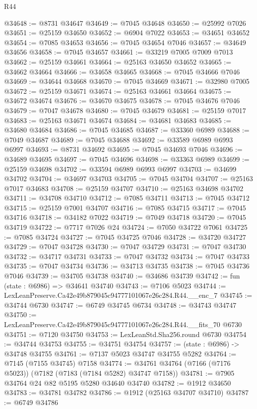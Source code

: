 \begin{lexlean}{R44}
\begin{coremodule}
{@34648 := @8731 @34647
@34649 := @7045 @34648
@34650 := @25992 @7026
@34651 := @25159 @34650
@34652 := @6904 @7022
@34653 := @34651 @34652
@34654 := @7085 @34653
@34656 := @7045 @34654 @7046
@34657 := @34649 @34656
@34658 := @7045 @34657
@34661 := @33219 @7005 @7009 @7013
@34662 := @25159 @34661
@34664 := @25163 @34650 @34652
@34665 := @34662 @34664
@34666 := @34658 @34665
@34668 := @7045 @34666 @7046
@34669 := @34644 @34668
@34670 := @7045 @34669
@34671 := @32980 @7005
@34672 := @25159 @34671
@34674 := @25163 @34661 @34664
@34675 := @34672 @34674
@34676 := @34670 @34675
@34678 := @7045 @34676 @7046
@34679 := @7047 @34678
@34680 := @7045 @34679
@34681 := @25159 @7017
@34683 := @25163 @34671 @34674
@34684 := @34681 @34683
@34685 := @34680 @34684
@34686 := @7045 @34685
@34687 := @33360 @6989
@34688 := @7049 @34687
@34689 := @7045 @34688
@34692 := @33589 @6989 @6993 @6997
@34693 := @8731 @34692
@34695 := @7045 @34693 @7046
@34696 := @34689 @34695
@34697 := @7045 @34696
@34698 := @33363 @6989
@34699 := @25159 @34698
@34702 := @33594 @6989 @6993 @6997
@34703 := @34699 @34702
@34704 := @34697 @34703
@34705 := @7045 @34704
@34707 := @25163 @7017 @34683
@34708 := @25159 @34707
@34710 := @25163 @34698 @34702
@34711 := @34708 @34710
@34712 := @7085 @34711
@34713 := @7045 @34712
@34715 := @25159 @7001 @34707
@34716 := @7085 @34715
@34717 := @7045 @34716
@34718 := @34182 @7022
@34719 := @7049 @34718
@34720 := @7045 @34719
@34722 := @7717 @7026 @24
@34724 := @7050 @34722 @7061
@34725 := @7085 @34724
@34727 := @7045 @34725 @7046
@34728 := @34720 @34727
@34729 := @7047 @34728
@34730 := @7047 @34729
@34731 := @7047 @34730
@34732 := @34717 @34731
@34733 := @7047 @34732
@34734 := @7047 @34733
@34735 := @7047 @34734
@34736 := @34713 @34735
@34738 := @7045 @34736 @7046
@34739 := @34705 @34738
@34740 := @34686 @34739
@34742 := fun (state : @6986) => @34641 @34740
@34743 := @7106 @5023
@34744 := LexLeanPreserve.Ca42e49b879045c94777101067e26c284.R44.__enc_7
@34745 := @34744 @6730
@34747 := @6749 @34745 @6734
@34748 := @34743 @34747
@34750 := LexLeanPreserve.Ca42e49b879045c94777101067e26c284.R44.__fits_70 @6730
@34751 := @7120 @34750
@34753 := LexLeanStd.Sha256.round @6730
@34754 := @34744 @34753
@34755 := @34751 @34754
@34757 := (state : @6986) -> @34748 @34755
@34761 := @7137 @5023 @34747 @34755 @5282
@34764 := @7145 (@7155 @34745) @7158
@34774 := @34761 @34764 (@7166 (@7176 @5023)) (@7182 (@7183 (@7184 @5282) @34747 @7158))
@34781 := @7905 @34764 @24 @82 @5195 @5280 @34640 @34740
@34782 := @1912 @34650
@34783 := @34781 @34782
@34786 := @1912 (@25163 @34707 @34710)
@34787 := @6749 @34786
}
\end{coremodule}
\end{lexlean}
